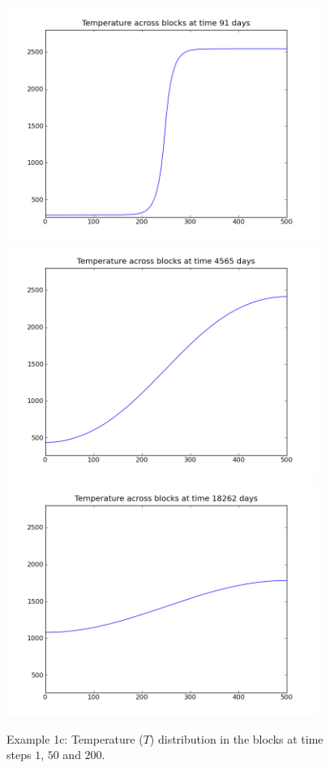 \begin{figure}
\begin{center}
\includegraphics[width=4in]{figures/blockspyplot001}
\includegraphics[width=4in]{figures/blockspyplot050}
\includegraphics[width=4in]{figures/blockspyplot200}
\caption{Example 1c: Temperature ($T$) distribution in the blocks at time steps $1$, $50$ and $200$.}
\label{fig:onedheatout} 
\end{center}
\end{figure}

